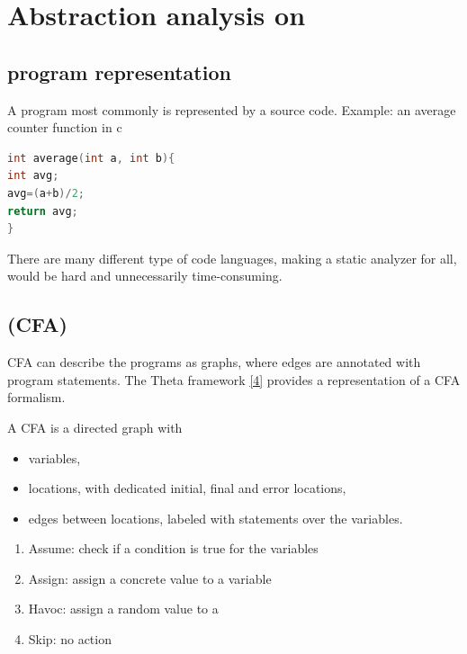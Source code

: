 \chapter{Abstraction analysis on \cfa}
\label{sec:cfa}


\section{program representation}

A program most commonly is represented by a source code. Example: an average counter function in c

\begin{lstlisting}[language=C,breaklines=true]
int average(int a, int b){
int avg;
avg=(a+b)/2;
return avg;
}
\end{lstlisting}

There are many different type of code languages, making a static analyzer for all, would be hard and unnecessarily time-consuming. 

\section{\cfa (CFA)}
\label{sec:cfaleiras}
CFA can describe the programs as graphs, where edges are annotated with program statements. The Theta framework \hyperref[sec:ref]{[4]} provides a representation of a CFA formalism.

A CFA is a directed graph with
 
\begin{itemize}
	\item variables,
	\item locations, with dedicated initial, final and error locations,
	\item edges between locations, labeled with statements over the variables.
\end{itemize}

\begin{enumerate}
	\item Assume: check if a condition is true for the variables
	\item Assign: assign a concrete value to a variable
	\item Havoc: assign a random value to a 
	\item Skip: no action
\end{enumerate}

